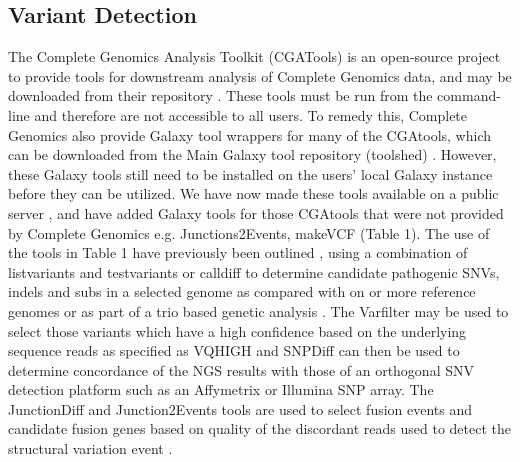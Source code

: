 \documentclass[10pt]{bmc_article}
\newenvironment{bmcformat}{\begin{raggedright}\baselineskip20pt\sloppy\setboolean{publ}{false}}{\end{raggedright}\baselineskip20pt\sloppy}
\begin{document}
\begin{bmcformat}
\subsection*{Variant Detection}
The Complete Genomics Analysis Toolkit (CGATools) is an open-source project to provide tools for downstream analysis of Complete Genomics data, and may be downloaded from their repository \cite{url-cgatools}. These tools must be run from the command-line and therefore are not accessible to all users. To remedy this, Complete Genomics also provide Galaxy tool wrappers for many of the CGAtools, which can be downloaded from the Main Galaxy tool repository (toolshed) \cite{url-toolshed}. However, these Galaxy tools still need to be installed on the users’ local Galaxy instance before they can be utilized. We have now made these tools available on a public server \cite{url-nbicgalaxy}, and have added Galaxy tools for those CGAtools that were not provided by Complete Genomics e.g. Junctions2Events, makeVCF (Table 1).  The use of the tools in Table 1 have previously been outlined \cite{nieminen}, using a combination of listvariants and testvariants or calldiff to determine candidate pathogenic SNVs, indels and subs in a selected genome as compared with on or more reference genomes or as part of a trio based genetic analysis \cite{nieminen}.  The Varfilter may be used to select those variants which have a high confidence based on the underlying sequence reads as specified as VQHIGH and SNPDiff can then be used to determine concordance of the NGS results with those of an orthogonal SNV detection platform such as an Affymetrix or Illumina SNP array.  The JunctionDiff and Junction2Events tools are used to select fusion events and candidate fusion genes based on quality of the discordant reads used to detect the structural variation event \cite{ifuse}.


\end{bmcformat}
\end{document}

